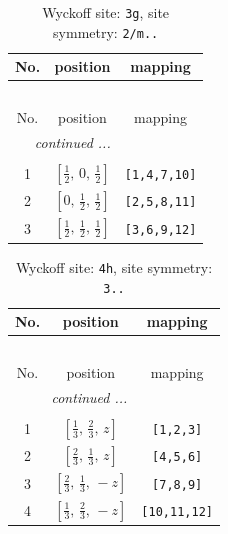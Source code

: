 \documentclass[fleqn,8pt]{jsarticle}
\begin{document}
\begin{longtable}{ccc}
\caption{Wyckoff site: {\tt 3g}, site symmetry: {\tt 2/m..}}
 \\
 \hline \hline
No. & position & mapping \\ \hline \endfirsthead

\multicolumn{2}{l}{\tablename\ \thetable{}} \\
 \hline \hline
No. & position & mapping \\ \hline \endhead

 \hline \hline
\multicolumn{2}{r}{\footnotesize\it continued ...} \\ \endfoot

 \hline \hline
\multicolumn{2}{r}{} \\ \endlastfoot

1 & $\left[ \frac{1}{2},\, 0,\, \frac{1}{2} \right]$ & {\tt [1,4,7,10]} \\ \hline
2 & $\left[ 0,\, \frac{1}{2},\, \frac{1}{2} \right]$ & {\tt [2,5,8,11]} \\ \hline
3 & $\left[ \frac{1}{2},\, \frac{1}{2},\, \frac{1}{2} \right]$ & {\tt [3,6,9,12]} \\
\end{longtable}
\renewcommand{\arraystretch}{1.2}
\begin{longtable}{ccc}
\caption{Wyckoff site: {\tt 4h}, site symmetry: {\tt 3..}}
 \\
 \hline \hline
No. & position & mapping \\ \hline \endfirsthead

\multicolumn{2}{l}{\tablename\ \thetable{}} \\
 \hline \hline
No. & position & mapping \\ \hline \endhead

 \hline \hline
\multicolumn{2}{r}{\footnotesize\it continued ...} \\ \endfoot

 \hline \hline
\multicolumn{2}{r}{} \\ \endlastfoot

1 & $\left[ \frac{1}{3},\, \frac{2}{3},\, z \right]$ & {\tt [1,2,3]} \\ \hline
2 & $\left[ \frac{2}{3},\, \frac{1}{3},\, z \right]$ & {\tt [4,5,6]} \\ \hline
3 & $\left[ \frac{2}{3},\, \frac{1}{3},\, - z \right]$ & {\tt [7,8,9]} \\ \hline
4 & $\left[ \frac{1}{3},\, \frac{2}{3},\, - z \right]$ & {\tt [10,11,12]} \\
\end{longtable}
\end{document}
